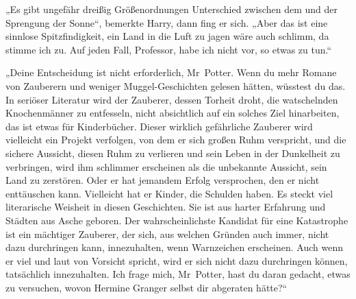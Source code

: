 „Es gibt ungefähr dreißig Größenordnungen Unterschied zwischen dem und der Sprengung der Sonne“, bemerkte Harry, dann fing er sich. „Aber das ist eine sinnlose Spitzfindigkeit, ein Land in die Luft zu jagen wäre auch schlimm, da stimme ich zu. Auf jeden Fall, Professor, habe ich nicht vor, so etwas zu tun.“

„Deine Entscheidung ist nicht erforderlich, Mr~Potter. Wenn du mehr Romane von Zauberern und weniger Muggel-Geschichten gelesen hätten, wüsstest du das. In seriöser Literatur wird der Zauberer, dessen Torheit droht, die watschelnden Knochenmänner zu entfesseln, nicht absichtlich auf ein solches Ziel hinarbeiten, das ist etwas für Kinderbücher. Dieser wirklich gefährliche Zauberer wird vielleicht ein Projekt verfolgen, von dem er sich großen Ruhm verspricht, und die sichere Aussicht, diesen Ruhm zu verlieren und sein Leben in der Dunkelheit zu verbringen, wird ihm schlimmer erscheinen als die unbekannte Aussicht, sein Land zu zerstören. Oder er hat jemandem Erfolg versprochen, den er nicht enttäuschen kann. Vielleicht hat er Kinder, die Schulden haben. Es steckt viel literarische Weisheit in diesen Geschichten. Sie ist aus harter Erfahrung und Städten aus Asche geboren. Der wahrscheinlichste Kandidat für eine Katastrophe ist ein mächtiger Zauberer, der sich, aus welchen Gründen auch immer, nicht dazu durchringen kann, innezuhalten, wenn Warnzeichen erscheinen. Auch wenn er viel und laut von Vorsicht spricht, wird er sich nicht dazu durchringen können, tatsächlich innezuhalten. Ich frage mich, Mr~Potter, hast du daran gedacht, etwas zu versuchen, wovon Hermine Granger selbst dir abgeraten hätte?“

